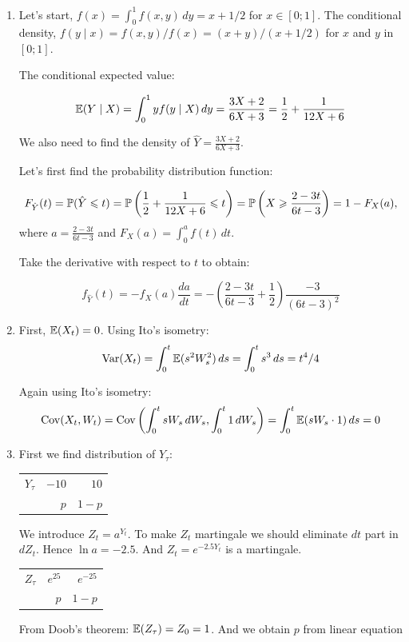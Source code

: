 \documentclass[12pt, a4paper]{article}
\begin{document}
\begin{enumerate}
\item Let's start, $f(x)=\int_0^1 f(x,y) \, dy= x+1/2$ for $x\in [0;1]$. The conditional density, $f(y \mid x)=f(x,y)/f(x)=(x+y)/(x+1/2)$ for $x$ and $y$ in $[0;1]$.

The conditional expected value:

\[
\E(Y \mid X)=\int_0^1 y f(y \mid X) \, dy = \frac{3X+2}{6X+3}=\frac{1}{2}+\frac{1}{12X+6}
\]

We also need to find the density of $\hat{Y}=\frac{3X+2}{6X+3}$.

Let's first find the probability distribution function:

\[
F_{\hat{Y}}(t)=\P(\hat{Y} \leq t) = \P\left( \frac{1}{2}+\frac{1}{12X+6} \leq t \right) = \P\left( X \geq \frac{2-3t}{6t-3} \right)= 1 - F_X(a),
\]
where $a=\frac{2-3t}{6t-3}$ and $F_X(a) = \int_0^a f(t) \, dt$.

Take the derivative with respect to $t$ to obtain:

\[
f_{\hat{Y}}(t)=-f_X(a)\frac{da}{dt}=-\left( \frac{2-3t}{6t-3} + \frac{1}{2}  \right) \frac{-3}{(6t-3)^2}
\]

\item First, $\E(X_t)=0$. Using Ito's isometry:
\[
\Var(X_t)=\int_0^t  \E(s^2 W_s^2)  \, ds = \int_0^t  s^3  \, ds = t^4/4
\]

Again using Ito's isometry:
\[
\Cov( X_t, W_t) = \Cov \left( \int_0^t sW_s \, dW_s , \int_0^t 1 \, dW_s \right) = \int_0^t \E(sW_s\cdot 1) \, ds = 0
\]

\item First we find distribution of $Y_{\tau}$:

\begin{tabular}{rrr}
\toprule
$Y_{\tau}$ & $-10$ & $10$ \\
          & $p$   & $1-p$ \\
\bottomrule
\end{tabular}

We introduce $Z_t = a^{Y_t}$. To make $Z_t$ martingale we should eliminate $dt$ part in $dZ_t$. Hence $\ln a = -2.5$.  And $Z_t = e^{-2.5 Y_t}$ is a martingale.

\begin{tabular}{rrr}
\toprule
$Z_{\tau}$ & $e^{25}$ & $e^{-25}$ \\
          & $p$   & $1-p$ \\
\bottomrule
\end{tabular}

From Doob's theorem: $\E(Z_{\tau}) = Z_0 = 1$. And we obtain $p$ from linear equation


\end{enumerate}
\end{document}
